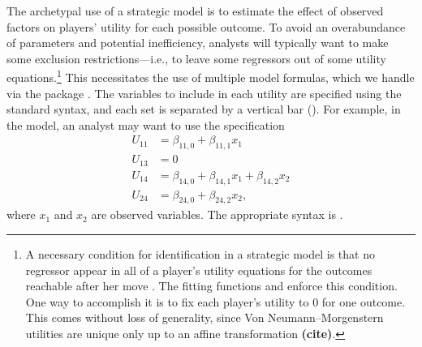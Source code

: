 \documentclass[article]{jss}
\begin{document}
The archetypal use of a strategic model is to estimate the effect of observed
factors on players' utility for each possible outcome.  To avoid
an overabundance of parameters and potential inefficiency, analysts will
typically want to make some exclusion restrictions---i.e., to leave some
regressors out of some utility equations.\footnote{A necessary condition for
  identification in a strategic model is that no regressor appear in all of a
  player's utility equations for the outcomes reachable after her move
  \citep{Lewis2003}.  The fitting functions and  enforce this
  condition.  One way to accomplish it is to fix each player's utility to $0$
  for one outcome.  This comes without loss of generality, since Von
  Neumann--Morgenstern utilities are unique only up to an affine transformation
  \textbf{(cite)}.}  This necessitates the use of multiple model formulas, which
we handle via the  package \citep{Formulapkg}.  The variables to
include in each utility are specified using the standard  syntax,
and each set is separated by a vertical bar (\code{|}).  For example, in the
 model, an analyst may want to use the specification
\begin{align*}
  U_{11} &= \beta_{11,0} + \beta_{11,1} x_1 \\
  U_{13} &= 0 \\
  U_{14} &= \beta_{14,0} + \beta_{14,1} x_1 + \beta_{14,2} x_2 \\
  U_{24} &= \beta_{24,0} + \beta_{24,2} x_2,
\end{align*}
where $x_1$ and $x_2$ are observed variables.  The appropriate 
syntax is .
\end{document}
